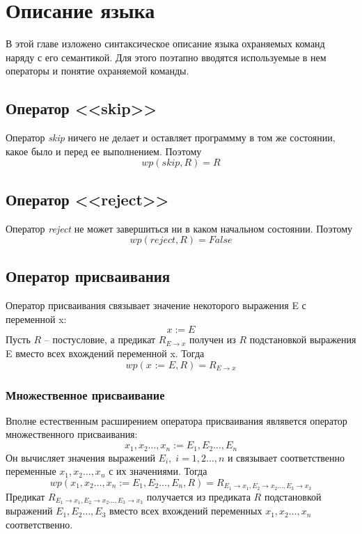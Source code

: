 \chapter{Описание языка} \label{ch2}
В этой главе изложено синтаксическое описание языка охраняемых команд наряду с его семантикой.
Для этого поэтапно вводятся используемые в нем операторы и понятие охраняемой команды.
\section{Оператор <<skip>>}
Оператор \textit{skip} ничего не делает и оставляет программму в том же состоянии, какое было и перед ее
выполнением. Поэтому 
\begin{equation}
	wp(\textit{skip}, R) = R
\end{equation}
\section{Оператор <<reject>>}
Оператор \textit{reject} не может завершиться ни в каком начальном состоянии. Поэтому
\begin{equation}
	wp(\textit{reject}, R) = False
\end{equation}
\section{Оператор присваивания}
Оператор присваивания связывает значение некоторого выражения E с переменной x:
\begin{equation}
	x := E
\end{equation}
Пусть $R$ -- постусловие, а предикат $R_{E\rightarrow x}$ получен из $R$ подстановкой выражения E вместо
всех вхождений переменной x. Тогда 
\begin{equation}
	wp(\textit{x := E}, R) = R_{E\rightarrow x}
\end{equation}
	\subsection{Множественное присваивание}
	Вполне естественным расширением оператора присваивания являвется оператор множественного присваивания:
\begin{equation}
	x_1, x_2 \ldots, x_n := E_1, E_2 \ldots, E_n
\end{equation}
	Он вычисляет значения выражений $E_i, \; i=1,2\ldots, n$ и связывает соответственно переменные $x_1, x_2 \ldots, x_n$ с
	их значениями. Тогда
	\begin{equation}
		wp(x_1, x_2 \ldots, x_n := E_1, E_2 \ldots, E_n, R) = R_{E_1\rightarrow x_1, E_2\rightarrow x_2 \ldots, E_3\rightarrow x_3} 
	\end{equation}
	Предикат $R_{E_1\rightarrow x_1, E_2\rightarrow x_2 \ldots, E_3\rightarrow x_3}$ получается из предиката $R$ подстановкой
	выражений $E_1, E_2 \ldots, E_3$ вместо всех вхождений переменных $x_1, x_2 \ldots, x_n$ соответственно.
